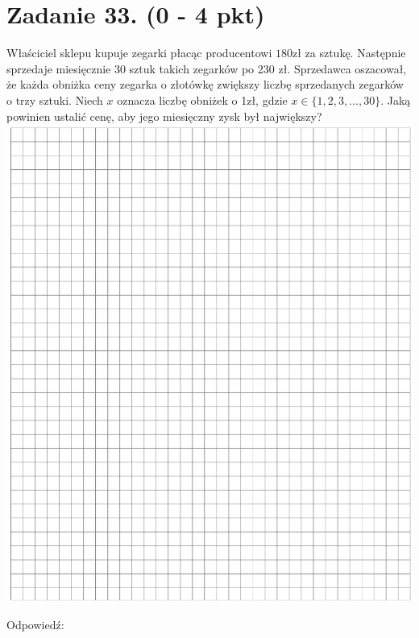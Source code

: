 \documentclass[10pt]{article}
\begin{document}
\section*{Zadanie 33. (0 - 4 pkt)}
Właściciel sklepu kupuje zegarki płacąc producentowi \(180 \mathrm{zł}\) za sztukę. Następnie sprzedaje miesięcznie 30 sztuk takich zegarków po 230 zł. Sprzedawca oszacował, że każda obniżka ceny zegarka o złotówkę zwiększy liczbę sprzedanych zegarków o trzy sztuki. Niech \(x\) oznacza liczbę obniżek o 1zł, gdzie \(x \in\{1,2,3, \ldots, 30\}\). Jaką powinien ustalić cenę, aby jego miesięczny zysk był największy?\\
\includegraphics[max width=\textwidth, center]{2024_11_21_997c30e0b98e62837d84g-18}

Odpowiedź:
\end{document}
